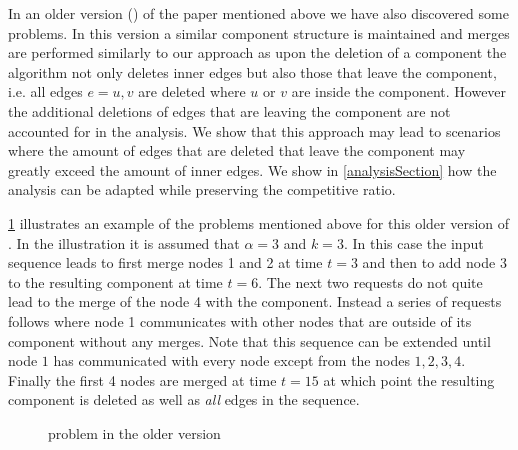 \documentclass[a4paper,xcolor=dvipsnames, tikz, 12pt]{article}
\newcommand{\crep}{\text{C{\scriptsize REP}}}
\newcommand{\request}[3]{\draw (axis cs:#3,#1) -- node[left]{} (axis cs:#3,#2);}
\theoremstyle{definition}
\begin{document}
	In an older version (\cite{Avin2015}) of the paper mentioned above we have also discovered some problems. In this version a similar component structure is maintained and merges are performed similarly to our approach as upon the deletion of a component the algorithm not only deletes inner edges but also those that leave the component, i.e. all edges $e={u,v}$ are deleted where $u$ or $v$ are inside the component. However the additional deletions of edges that are leaving the component are not accounted for in the analysis. We show that this approach may lead to scenarios where the amount of edges that are deleted that leave the component may greatly exceed the amount of inner edges. We show in \cref{analysisSection} how the analysis can be adapted while preserving the competitive ratio.
	
	\cref{exOldCrep} illustrates an example of the problems mentioned above for this older version of \crep{}. In the illustration it is assumed that $\alpha=3$ and $k=3$. In this case the input sequence leads \crep{} to first merge nodes 1 and 2 at time $t=3$ and then to add node 3 to the resulting component at time $t= 6$. The next two requests do not quite lead to the merge of the node 4 with the component. Instead a series of requests follows where node 1 communicates with other nodes that are outside of its component without any merges. Note that this sequence can be extended until node $1$ has communicated with every node except from the nodes $1,2,3,4$. Finally the first 4 nodes are merged at time $t=15$ at which point the resulting component is deleted as well as \textit{all} edges in the sequence. 


\begin{figure}
	\caption{problem in the older version}\label{exOldCrep}
	
\end{figure}
	
\end{document}

